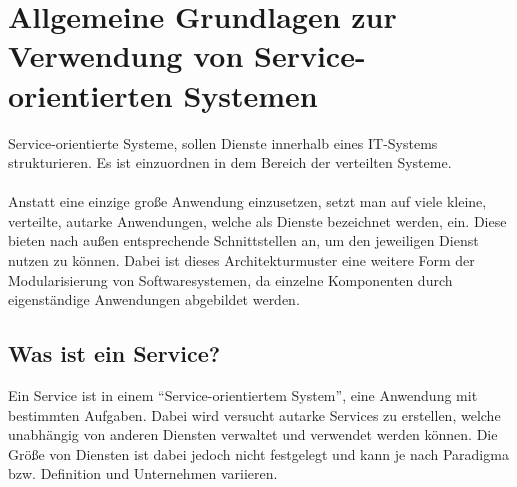 \chapter[Grundlagen von Service-orientierten Systemen]{Allgemeine Grundlagen zur Verwendung von Service-orientierten Systemen}
\label{chap:Grundlagen}
Service-orientierte Systeme, sollen Dienste innerhalb eines IT-Systems strukturieren. Es ist einzuordnen in dem Bereich der verteilten Systeme.
\\\\
Anstatt eine einzige große Anwendung einzusetzen, setzt man auf viele kleine, verteilte, autarke Anwendungen, welche als Dienste bezeichnet werden, ein. Diese bieten nach außen entsprechende Schnittstellen an, um den jeweiligen Dienst nutzen zu können. Dabei ist dieses Architekturmuster eine weitere Form der Modularisierung von Softwaresystemen, da einzelne Komponenten durch eigenständige Anwendungen abgebildet werden.

\section{Was ist ein Service?}
\label{sec:WasIstEinService?}
Ein Service ist in einem "`Service-orientiertem System"', eine Anwendung mit bestimmten Aufgaben. Dabei wird versucht autarke Services zu erstellen, welche unabhängig von anderen Diensten verwaltet und verwendet werden können. Die Größe von Diensten ist dabei jedoch nicht festgelegt und kann je nach Paradigma bzw. Definition und Unternehmen variieren.

